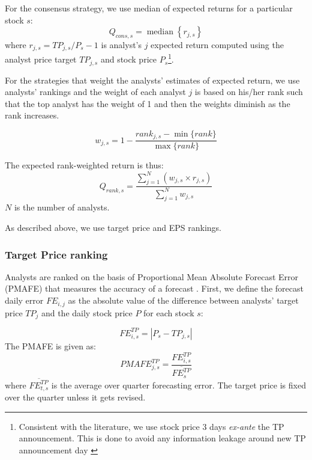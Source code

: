 \documentclass{book}
\DeclareMathOperator*{\median}{median}
\begin{document}
For the consensus strategy, we use median of expected returns for a particular stock $s$:
\begin{equation}
\label{consq}
Q_{cons,s}= \median \left\{r_{j,s}\right\}
\end{equation}
where $r_{j,s}=TP_{j,s}/P_{s}-1$  is analyst's $j$ expected return computed using the analyst price target $TP_{j,s}$ and stock price $P_{s}$\footnote{Consistent with the literature, we use stock price 3 days \emph{ex-ante} the TP announcement. This is done to avoid any information leakage around new TP announcement day \citep{bonini2010}}. 

For the strategies that weight the analysts' estimates of expected return, we use analysts' rankings and the weight of each analyst $j$ is based on his/her rank such that the top analyst has the weight of 1 and then the weights diminish as the rank increases.


\begin{equation}
\label{eq:weight}
w_{j,s}=1-\frac{rank_{j,s}-\min{ \{rank \} }}{\max{\{rank \}}}
\end{equation}

The expected rank-weighted return is thus:
\begin{equation}
\label{rankq}
Q_{rank,s}=\frac{\sum_{j=1}^{N} (w_{j,s} \times r_{j,s})}{\sum_{j=1}^{N} w_{j,s}}
\end{equation}
$N$ is the number of analysts.

As described above, we use target price and EPS rankings.

\subsubsection{Target Price ranking} 

Analysts are ranked on the basis of Proportional Mean Absolute Forecast Error (PMAFE) that measures the accuracy of a forecast  \citep{clement1999,brown2001,ertimur2007}. First,  we define the forecast daily error  $FE_{i,j}$ as the absolute value of the difference between analysts' target price $TP_{j}$ and the daily stock price $P$ for each stock $s$:

\begin{equation}
\label{dfe}
FE_{i,s}^{TP}=|{P_{s}-TP_{j,s}}|
\end{equation}
The PMAFE is given as:
\begin{equation}
\label{tp:pmafe}
PMAFE_{j,s}^{TP}=\frac{FE_{i,s}^{TP}}{\overline{FE_{s}^{TP}}}
\end{equation}
where $\overline{{FE}_{t,s}^{TP}}$ is the average over quarter forecasting error. The target price is fixed over the quarter unless it gets revised.
\end{document}
